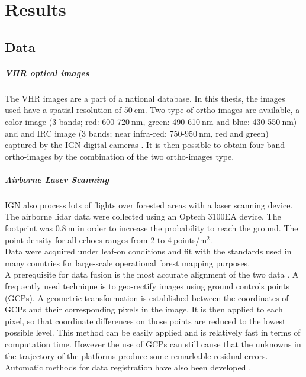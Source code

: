 
\chapter{Results} %
\label{Chapter3} %

\startcontents[chapters]
\Mprintcontents

\section{Data}

\paragraph{VHR optical images \\}
The VHR images are a part of a national database. In this thesis, the images used have a spatial resolution of 50$\:$cm. Two type of ortho-images are available, a color image (3 bands; red: 600-720$\:$nm, green: 490-610$\:$nm and blue: 430-550$\:$nm) and and IRC image (3 bands; near infra-red: 750-950$\:$nm, red and green) captured by the IGN digital cameras \citep{souchon2012large}. It is then possible to obtain four band ortho-images by the combination of the two ortho-images type. \\
\paragraph{Airborne Laser Scanning \\}
IGN also process lots of flights over forested areas with a laser scanning device. The airborne lidar data were collected using an Optech 3100EA device. The footprint was 0.8$\:$m in order to increase the probability to reach the ground. The point density {for all echoes} ranges from 2 to 4$\:$points/m$^{2}$. \\
Data were acquired under leaf-on conditions and fit with the standards used in many countries for large-scale operational forest mapping purposes. \\

A prerequisite for data fusion is the most accurate alignment of the two data \citep{torabzadeh2014fusion}. A frequently used technique is to geo-rectify images using ground controls points (GCPs). A geometric transformation is established between the coordinates of GCPs and their corresponding pixels in the image. It is then applied to each pixel, so that coordinate differences on those points are reduced to the lowest possible level. This method can be easily applied and is relatively fast in terms of computation time. However the use of GCPs can still cause that the unknowns in the trajectory of the platforms produce some remarkable residual errors. Automatic methods for data registration have also been developed \citep{habib2005photogrammetric,mastin2009automatic}. \\

